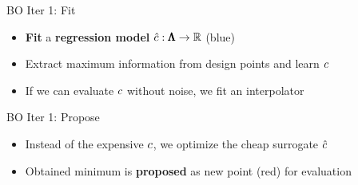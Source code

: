 \documentclass[main]{subfiles}
\begin{document}




\begin{frame}[t]{BO Iter 1: Fit}
  \begin{itemize}
    \item \textbf{Fit} a \textbf{regression model} $\hat{c}: \pmb{\Lambda} \to \mathbb{R}$ (blue)
    \item Extract maximum information from design points and learn $c$
    \item If we can evaluate $c$ without noise, we fit an interpolator
  \end{itemize}
\end{frame}


\begin{frame}[t,noframenumbering]{BO Iter 1: Propose}
  \begin{itemize}
    \item Instead of the expensive $c$, we optimize the cheap surrogate $\hat{c}$
    \item Obtained minimum is \textbf{proposed} as new point (red) for evaluation
  \end{itemize}
\end{frame}
\end{document}
